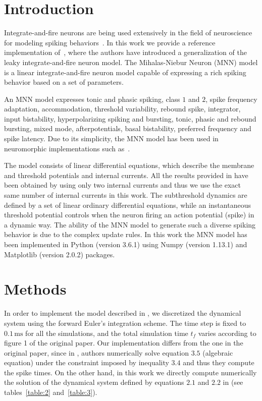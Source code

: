 \documentclass[10pt,a4paper,onecolumn]{article}
\newcommand{\Rm}[1]{\mathrm{#1}}
\begin{document}
\section{Introduction}\label{introduction}

Integrate-and-fire neurons are being used extensively in the field of 
neuroscience for modeling spiking behaviors~\cite{dayan:2001}. In this work we
provide a reference implementation of~\cite{mihalas:2009}, where the authors
have introduced a generalization of the leaky integrate-and-fire neuron model. 
The Mihalas-Niebur Neuron (MNN) model is a linear integrate-and-fire neuron
model capable of expressing a rich spiking behavior based on a set of 
parameters.

An MNN model expresses tonic and phasic spiking, class $1$ and $2$, spike
frequency adaptation, accommodation, threshold variability, rebound spike,
integrator, input bistability, hyperpolarizing spiking and bursting, tonic,
phasic and rebound bursting, mixed mode, afterpotentials, basal bistability, 
preferred frequency and spike latency. 
Due to its simplicity, the MNN model has been used in neuromorphic 
implementations such as~\cite{folowosele:2011}. 

The model consists of linear differential equations, which describe the membrane
and threshold potentials and internal currents. All the results provided in 
\cite{mihalas:2009} have been obtained by using only two internal currents and
thus we use the exact same number of internal currents in this work. The
subthreshold dynamics are defined by a set of linear ordinary differential 
equations, while an instantaneous threshold potential controls when the neuron
firing an action potential (spike) in a dynamic way. The ability of the MNN 
model to generate 
such a diverse spiking behavior is due to the complex update rules. In this 
work the MNN model has been implemented in Python (version 3.6.1) using 
Numpy (version 1.13.1) and Matplotlib (version 2.0.2) packages. 



\section{Methods}\label{methods}

In order to implement the model described in \cite{mihalas:2009}, we discretized
the dynamical system using the forward Euler's integration scheme. The time step
is fixed to $0.1\, \Rm{ms}$ for all the simulations, and the total simulation
time $t_f$ varies according to figure 1 of the original paper. Our
implementation differs from the one in the original paper, since in
\cite{mihalas:2009}, authors numerically solve equation $3.5$ (algebraic 
equation) under the constraint imposed by inequality $3.4$ and thus they
compute the spike times. On the other hand, in this work we directly compute
numerically the solution of the dynamical system defined by equations $2.1$
and $2.2$ in \cite{mihalas:2009} (see tables~\ref{table:2} and~\ref{table:3}). 
\end{document}
